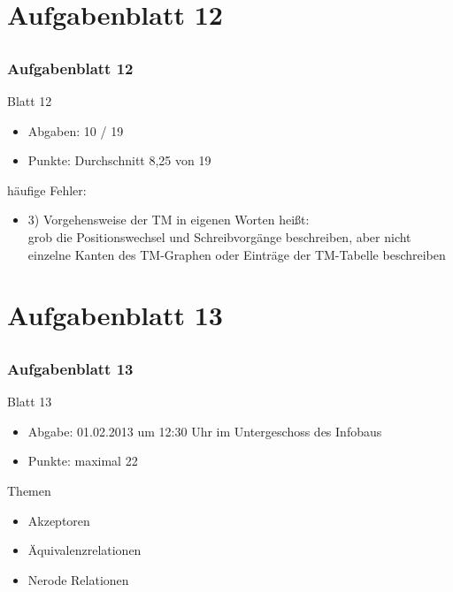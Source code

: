 \section[Rückblick]{Aufgabenblatt 12}
\subsection*{}
\begin{frame}
	\frametitle{Aufgabenblatt 12}
	\begin{block}{Blatt 12}
		\begin{itemize}
			\item Abgaben: 10 / 19
			\item Punkte: Durchschnitt 8,25 von 19
		\end{itemize}
		häufige Fehler:
		\begin{itemize}
			\item 3) Vorgehensweise der TM in eigenen Worten heißt: \\
			grob die Positionswechsel und Schreibvorgänge beschreiben, aber nicht einzelne Kanten des TM-Graphen oder Einträge der TM-Tabelle beschreiben
		\end{itemize}
   \end{block}
\end{frame}

\section[Blatt 13]{Aufgabenblatt 13}
\subsection*{}
\begin{frame}
	\frametitle{Aufgabenblatt 13}
	\begin{block}{Blatt 13}
		\begin{itemize}
			\item Abgabe: 01.02.2013 um 12:30 Uhr im Untergeschoss des Infobaus
			\item Punkte: maximal 22
		\end{itemize}
  	\end{block}
	\begin{block}{Themen}
		\begin{itemize}
	  		\item Akzeptoren
	  		\item Äquivalenzrelationen
	  		\item Nerode Relationen
	 	\end{itemize}
	\end{block}
\end{frame}

